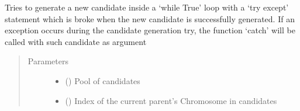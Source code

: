 \documentclass[letterpaper,10pt,english]{sphinxmanual}
\begin{document}
\begin{fulllineitems}
\begin{fulllineitems}
\begin{quote}
\begin{description}
\end{description}\end{quote}

\end{fulllineitems}


\begin{fulllineitems}
\label{\detokenize{MolOpt.genetic:MolOpt.genetic.genetic.Genetic.__get_child}}
\sphinxAtStartPar
Tries to generate a new candidate inside a ‘while True’ loop with a ‘try except’ statement which is broke 
when the new candidate is successfully generated. If an exception occurs during the candidate generation try, 
the function ‘catch’ will be called with such candidate as argument
\begin{quote}\begin{description}
\item[{Parameters}] \leavevmode\begin{itemize}
\item {} 
\sphinxAtStartPar
{} (\sphinxstyleliteralemphasis{\sphinxupquote{{[}}}{\hyperref[\detokenize{MolOpt.genetic:MolOpt.genetic.genetic.Chromosome}]{\sphinxcrossref{\sphinxstyleliteralemphasis{\sphinxupquote{Chromosome}}}}}\sphinxstyleliteralemphasis{\sphinxupquote{{]}}}) \textendash{} Pool of candidates

\item {} 
\sphinxAtStartPar
{} () \textendash{} Index of the current parent’s Chromosome in candidates


\end{itemize}
\end{description}
\end{quote}
\end{fulllineitems}
\end{fulllineitems}
\end{document}
